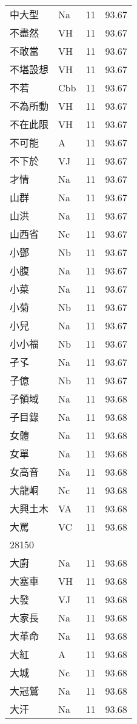 \documentclass[twocolumn]{book}
\begin{document}
\begin{supertabular}{llrr}
中大型 & Na & 11 &  93.67\\
不盡然 & VH & 11 &  93.67\\
不敢當 & VH & 11 &  93.67\\
不堪設想 & VH & 11 &  93.67\\
不若 & Cbb & 11 &  93.67\\
不為所動 & VH & 11 &  93.67\\
不在此限 & VH & 11 &  93.67\\
不可能 & A & 11 &  93.67\\
不下於 & VJ & 11 &  93.67\\
才情 & Na & 11 &  93.67\\
山群 & Na & 11 &  93.67\\
山洪 & Na & 11 &  93.67\\
山西省 & Nc & 11 &  93.67\\
小鄧 & Nb & 11 &  93.67\\
小腹 & Na & 11 &  93.67\\
小菜 & Na & 11 &  93.67\\
小菊 & Nb & 11 &  93.67\\
小兒 & Na & 11 &  93.67\\
小小福 & Nb & 11 &  93.67\\
孑孓 & Na & 11 &  93.67\\
子億 & Nb & 11 &  93.67\\
子領域 & Na & 11 &  93.68\\
子目錄 & Na & 11 &  93.68\\
女體 & Na & 11 &  93.68\\
女單 & Na & 11 &  93.68\\
女高音 & Na & 11 &  93.68\\
大龍峒 & Nc & 11 &  93.68\\
大興土木 & VA & 11 &  93.68\\
大罵 & VC & 11 &  93.68\\
28150\\
大廚 & Na & 11 &  93.68\\
大塞車 & VH & 11 &  93.68\\
大發 & VJ & 11 &  93.68\\
大家長 & Na & 11 &  93.68\\
大革命 & Na & 11 &  93.68\\
大紅 & A & 11 &  93.68\\
大城 & Nc & 11 &  93.68\\
大冠鷲 & Na & 11 &  93.68\\
大汗 & Na & 11 &  93.68\\

\end{supertabular}
\end{document}
